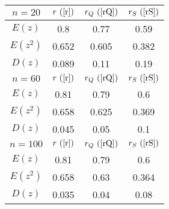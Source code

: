 \begin{tabular}{|c|c|c|c|}
\hline
$n = 20$ & $r ~(\ref{r})$ & $r_Q ~(\ref{rQ})$ & $r_S ~(\ref{rS})$\\
\hline
$E(z)$ & 0.8 & 0.77 & 0.59\\
\hline
$E(z^2)$ & 0.652 & 0.605 & 0.382\\
\hline
$D(z)$ & 0.089 & 0.11 & 0.19\\
\hline
$n = 60$ & $r ~(\ref{r})$ & $r_Q ~(\ref{rQ})$ & $r_S ~(\ref{rS})$\\
\hline
$E(z)$ & 0.81 & 0.79 & 0.6\\
\hline
$E(z^2)$ & 0.658 & 0.625 & 0.369\\
\hline
$D(z)$ & 0.045 & 0.05 & 0.1\\
\hline
$n = 100$ & $r ~(\ref{r})$ & $r_Q ~(\ref{rQ})$ & $r_S ~(\ref{rS})$\\
\hline
$E(z)$ & 0.81 & 0.79 & 0.6\\
\hline
$E(z^2)$ & 0.658 & 0.63 & 0.364\\
\hline
$D(z)$ & 0.035 & 0.04 & 0.08\\
\hline
\end{tabular}